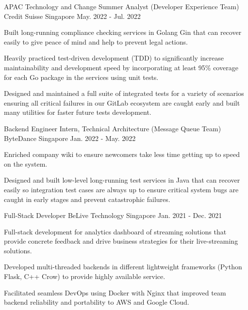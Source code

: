 \begin{cventries}
  \cventry
    {APAC Technology and Change Summer Analyst (Developer Experience Team)} %
    {Credit Suisse} %
    {Singapore} %
    {May. 2022 - Jul. 2022} %
    {
      \begin{cvitems} %
        \item {Built long-running compliance checking services in Golang Gin that can recover easily to give peace of mind and help to prevent legal actions.}
        \item {Heavily practiced test-driven development (TDD) to significantly increase maintainability and development speed by incorporating at least 95\% coverage for each Go package in the services using unit tests.}
        \item {Designed and maintained a full suite of integrated tests for a variety of scenarios ensuring all critical failures in our GitLab ecosystem are caught early and built many utilities for faster future tests development.}
      \end{cvitems}
    }

  \cventry
    {Backend Engineer Intern, Technical Architecture (Message Queue Team)} %
    {ByteDance} %
    {Singapore} %
    {Jan. 2022 - May. 2022} %
    {
      \begin{cvitems} %
        \item {Enriched company wiki to ensure newcomers take less time getting up to speed on the system.}
        \item {Designed and built low-level long-running test services in Java that can recover easily so integration test cases are always up to ensure critical system bugs are caught in early stages and prevent catastrophic failures.}
      \end{cvitems}
    }

  \cventry
    {Full-Stack Developer} %
    {BeLive Technology} %
    {Singapore} %
    {Jan. 2021 - Dec. 2021} %
    {
      \begin{cvitems} %
        \item {Full-stack development for analytics dashboard of streaming solutions that provide concrete feedback and drive business strategies for their live-streaming solutions.}
        \item {Developed multi-threaded backends in different lightweight frameworks (Python Flask, C++ Crow) to provide highly available service.}
        \item {Facilitated seamless DevOps using Docker with Nginx that improved team backend reliability and portability to AWS and Google Cloud.}
      \end{cvitems}
    }
    

\end{cventries}
